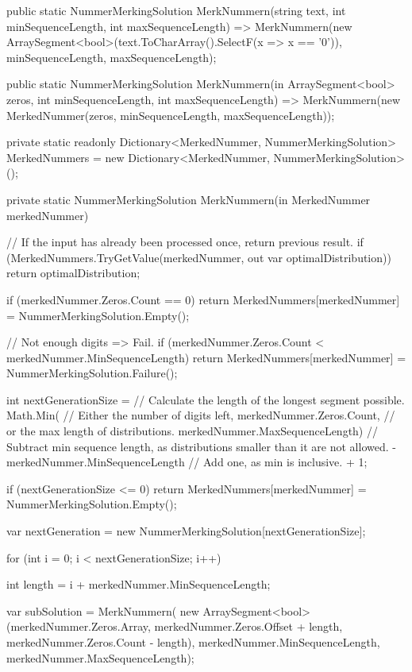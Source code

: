 \documentclass[a4paper,10pt,ngerman]{scrartcl}
\begin{document}
\begin{lstcs}
public static NummerMerkingSolution MerkNummern(string text, int minSequenceLength, int maxSequenceLength) =>
    MerkNummern(new ArraySegment<bool>(text.ToCharArray().SelectF(x => x == '0')), minSequenceLength, maxSequenceLength);

public static NummerMerkingSolution MerkNummern(in ArraySegment<bool> zeros, int minSequenceLength, int maxSequenceLength) =>
    MerkNummern(new MerkedNummer(zeros, minSequenceLength, maxSequenceLength));

private static readonly Dictionary<MerkedNummer, NummerMerkingSolution> MerkedNummers =
    new Dictionary<MerkedNummer, NummerMerkingSolution>();
    
private static NummerMerkingSolution MerkNummern(in MerkedNummer merkedNummer)
{
    // If the input has already been processed once, return previous result.
    if (MerkedNummers.TryGetValue(merkedNummer, out var optimalDistribution)) return optimalDistribution;

    if (merkedNummer.Zeros.Count == 0)
    {
        return MerkedNummers[merkedNummer] = NummerMerkingSolution.Empty();
    }

    // Not enough digits => Fail.
    if (merkedNummer.Zeros.Count < merkedNummer.MinSequenceLength)
    {
        return MerkedNummers[merkedNummer] = NummerMerkingSolution.Failure();
    }

    int nextGenerationSize =
        // Calculate the length of the longest segment possible.
        Math.Min(
            // Either the number of digits left,
            merkedNummer.Zeros.Count,
            // or the max length of distributions.
            merkedNummer.MaxSequenceLength)
        // Subtract min sequence length, as distributions smaller than it are not allowed.
        - merkedNummer.MinSequenceLength
        // Add one, as min is inclusive.
        + 1;

    if (nextGenerationSize <= 0)
    {
        return MerkedNummers[merkedNummer] = NummerMerkingSolution.Empty();
    }

    var nextGeneration = new NummerMerkingSolution[nextGenerationSize];

    for (int i = 0; i < nextGenerationSize; i++)
    {
        int length = i + merkedNummer.MinSequenceLength;

        var subSolution =
            MerkNummern(
                new ArraySegment<bool>(merkedNummer.Zeros.Array, merkedNummer.Zeros.Offset + length, merkedNummer.Zeros.Count - length),
                merkedNummer.MinSequenceLength,
                merkedNummer.MaxSequenceLength);

}}
\end{lstcs}
\end{document}
